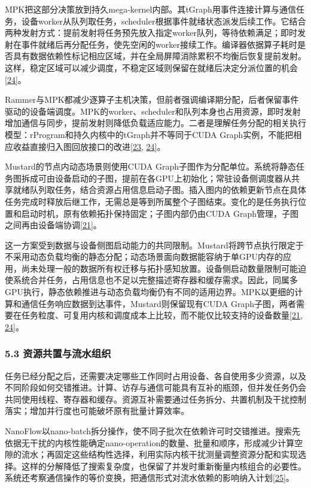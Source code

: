 \documentclass[UTF8,11pt,fontset=windows]{ctexart}
\begin{document}
MPK把这部分决策放到持久mega-kernel内部。其tGraph用事件连接计算与通信任务，设备worker从队列取任务，scheduler根据事件就绪状态派发后续工作。它结合两种发射方式：提前发射将任务预先放入指定worker队列，等待依赖满足；即时发射在事件就绪后再分配任务，使先空闲的worker接续工作。编译器依据算子耗时是否具有数据依赖性标记相应区域，并在全局屏障消除累积不均衡后恢复提前发射。这样，稳定区域可以减少调度，不稳定区域则保留在就绪后决定分派位置的机会\protect\hyperlink{ref-24}{{[}24{]}}。

Rammer与MPK都减少逐算子主机决策，但前者强调编译期分配，后者保留事件驱动的设备端调度。MPK的worker、scheduler和队列本身也占用资源，即时发射增加通信与同步，提前发射则降低负载适应能力。二者是理解任务分配的相关执行模型：rProgram和持久内核中的tGraph并不等同于CUDA Graph实例，不能把相应收益直接归入图回放接口的改进\protect\hyperlink{ref-23}{{[}23}, \protect\hyperlink{ref-24}{24{]}}。

Mustard的节点内动态场景则使用CUDA Graph子图作为分配单位。系统将静态任务图拆成可由设备启动的子图，提前在各GPU上初始化；常驻设备侧调度器从共享就绪队列取任务，结合资源占用信息启动子图。插入图内的依赖更新节点在具体任务完成时释放后继工作，无需总是等到所属整个子图结束。变化的是任务执行位置和启动时机，原有依赖拓扑保持固定；子图内部仍由CUDA Graph管理，子图之间再由设备端协调\protect\hyperlink{ref-21}{{[}21{]}}。

这一方案受到数据与设备侧图启动能力的共同限制。Mustard将跨节点执行限定于不采用动态负载均衡的静态分配；动态场景面向数据能容纳于单GPU内存的应用，尚未处理一般的数据所有权迁移与拓扑感知放置。设备侧启动数量限制可能迫使系统合并任务，占用信息也不足以完整描述寄存器和缓存需求。因此，同属多GPU执行，静态依赖推进与动态负载均衡仍有不同的适用边界。MPK以更细的计算和通信任务响应数据到达事件，Mustard则保留现有CUDA Graph子图，两者需要在任务粒度、可复用内核和调度成本上比较，而不能仅比较支持的设备数量\protect\hyperlink{ref-21}{{[}21}, \protect\hyperlink{ref-24}{24{]}}。

\hypertarget{section-5-3}{%
\subsubsection{5.3 资源共置与流水组织}\label{section-5-3}}

任务已经分配之后，还需要决定哪些工作同时占用设备、各自使用多少资源，以及不同阶段如何交错推进。计算、访存与通信可能具有互补的瓶颈，但并发任务仍会共同使用线程、寄存器和缓存。资源互补需要通过任务拆分、共置机制及干扰控制落实；增加并行度也可能破坏原有批量计算效率。

NanoFlow以nano-batch拆分操作，使不同子批次在依赖许可时交错推进。搜索先依据无干扰的内核性能确定nano-operation的数量、批量和顺序，形成减少计算空隙的流水；再固定这些结构性选择，利用实际内核干扰测量调整资源分配和实现选择。这样的分解降低了搜索复杂度，也保留了并发时重新衡量内核组合的必要性。系统还考察通信操作的等价变换，把通信形式对流水依赖的影响纳入计划\protect\hyperlink{ref-25}{{[}25{]}}。
\end{document}
